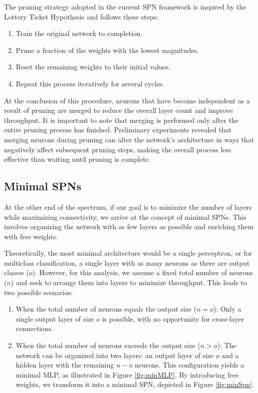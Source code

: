 The pruning strategy adopted in the current SPN framework is inspired by the Lottery Ticket Hypothesis and follows these steps:
\begin{enumerate}
    \item Train the original network to completion.
    \item Prune a fraction of the weights with the lowest magnitudes.
    \item Reset the remaining weights to their initial values.
    \item Repeat this process iteratively for several cycles.
\end{enumerate}

At the conclusion of this procedure, neurons that have become independent as a result of pruning are merged to reduce the overall layer count and improve throughput. It is important to note that merging is performed only after the entire pruning process has finished. Preliminary experiments revealed that merging neurons during pruning can alter the network's architecture in ways that negatively affect subsequent pruning steps, making the overall process less effective than waiting until pruning is complete.

\subsection{Minimal SPNs}

At the other end of the spectrum, if our goal is to minimize the number of layers while maximizing connectivity, we arrive at the concept of minimal SPNs. This involves organizing the network with as few layers as possible and enriching them with free weights.

Theoretically, the most minimal architecture would be a single perceptron, or for multiclass classification, a single layer with as many neurons as there are output classes ($o$). However, for this analysis, we assume a fixed total number of neurons ($n$) and seek to arrange them into layers to minimize throughput. This leads to two possible scenarios:

\begin{enumerate}
    \item When the total number of neurons equals the output size ($n = o$): Only a single output layer of size $o$ is possible, with no opportunity for cross-layer connections.
    \item When the total number of neurons exceeds the output size ($n > o$): The network can be organized into two layers: an output layer of size $o$ and a hidden layer with the remaining $n-o$ neurons. This configuration yields a minimal MLP, as illustrated in Figure \ref{fig:minMLP}. By introducing free weights, we transform it into a minimal SPN, depicted in Figure \ref{fig:minSpn}.
\end{enumerate}

